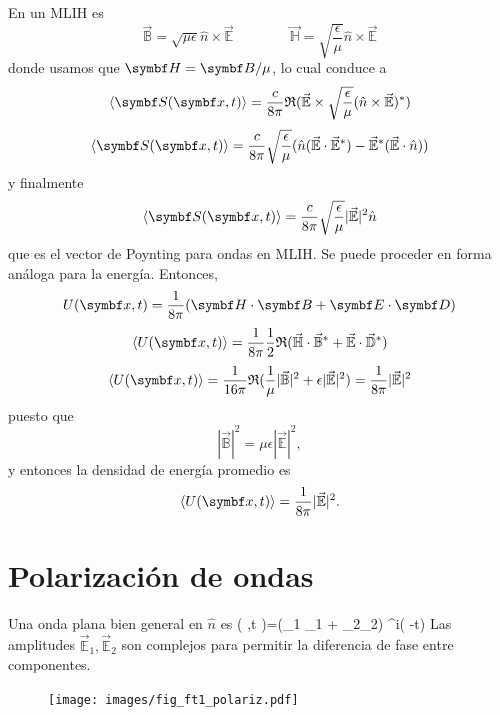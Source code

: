 \documentclass[10pt,oneside]{CBFT_book}
\begin{document}
En un MLIH es 
\[
	\vec{\mathbb{B}} = \sqrt{ \mu \epsilon } \hat{n} \times \vec{\mathbb{E}} \qquad\qquad 
	\vec{\mathbb{H}} = \sqrt{ \frac{\epsilon}{\mu } } \hat{n} \times \vec{\mathbb{E}}
\]
donde usamos que $\vb{H} = \vb{B}/\mu$, lo cual conduce a
\[
	\langle \vb{S}( \vb{x},t ) \rangle = \frac{c}{8\pi} \re( \vec{\mathbb{E}} \times 
		\sqrt{\frac{\epsilon}{\mu}}(\hat{n} \times \vec{\mathbb{E}})^* )
\]
\[
	\langle \vb{S}( \vb{x},t ) \rangle = \frac{c}{8\pi} \sqrt{\frac{\epsilon}{\mu}} 
		( \hat{n} (\vec{\mathbb{E}}\cdot\vec{\mathbb{E}}^*) - 
		\vec{\mathbb{E}}^*(\vec{\mathbb{E}}\cdot\hat{n}) )
\]
y finalmente
\[
	\langle \vb{S}( \vb{x},t ) \rangle = \frac{c}{8\pi} 
		\sqrt{\frac{\epsilon}{\mu}}|\vec{\mathbb{E}}|^2 \hat{n}
\]
que es el vector de Poynting para ondas en MLIH.
Se puede proceder en forma análoga para la energía. Entonces,
\[
	U(\vb{x},t) = \frac{1}{8\pi}( \pe{H}{B} + \pe{E}{D} )
\]
\[
	\langle U(\vb{x},t) \rangle = \frac{1}{8\pi} \frac{1}{2} \re ( 
	\vec{\mathbb{H}}\cdot\vec{\mathbb{B}}^* + \vec{\mathbb{E}}\cdot\vec{\mathbb{D}}^* )
\]
\[
	\langle U(\vb{x},t) \rangle = \frac{1}{16\pi}
		\re ( \frac{1}{\mu} |\vec{\mathbb{B}}|^2 + \epsilon |\vec{\mathbb{E}}|^2 ) =
		\frac{1}{8\pi} |\vec{\mathbb{E}}|^2
\]
puesto que 
\[
	|\vec{\mathbb{B}}|^2 = \mu\epsilon |\vec{\mathbb{E}}|^2,	
\]
y entonces la densidad de energía promedio es
\[
		\langle U(\vb{x},t) \rangle = \frac{1}{8\pi} |\vec{\mathbb{E}}|^2.
\]

\section{Polarización de ondas}

Una onda plana bien general en $\hat{n}$ es 
\be
	( ,t )=(\hat{\epsilon}_1 _1 + 
			\hat{\epsilon}_2_2) \euler^{i(  -\omega t)}
	\label{plane_wave_1}
\ee
Las amplitudes $\vec{\mathbb{E}}_1,\vec{\mathbb{E}}_2$ son complejos para permitir la diferencia 
de fase entre componentes.

\begin{figure}[htb]
	\begin{center}
	\texttt{[image: images/fig\_ft1\_polariz.pdf]} 
	\end{center}
	\caption{}
\end{figure} 
\end{document}
